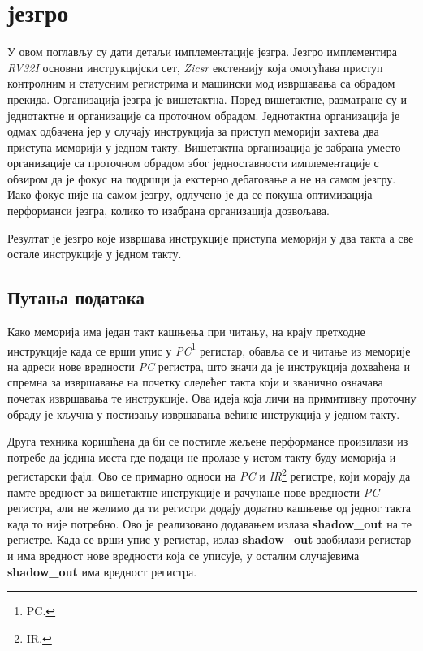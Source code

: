 \chapter{ језгро}

У овом поглављу су дати детаљи имплементације  језгра. Језгро имплементира \textit{RV32I} основни инструкцијски сет, \textit{Zicsr} екстензију која омогућава приступ контролним и статусним регистрима и машински мод извршавања са обрадом прекида.
Организација језгра је вишетактна. Поред вишетактне, разматране су и једнотактне и организације са проточном обрадом. Једнотактна организација је одмах одбачена јер у случају инструкција за приступ меморији захтева два приступа меморији у једном такту. Вишетактна организација је забрана уместо организације са проточном обрадом због једноставности имплементације с обзиром да је фокус на подршци ја екстерно дебаговање а не на самом језгру.
Иако фокус није на самом језгру, одлучено је да се покуша оптимизација перформанси језгра, колико то изабрана организација дозвољава.

Резултат је језгро које извршава инструкције приступа меморији у два такта а све остале инструкције у једном такту.

\section{Путања података}

Како меморија има један такт кашњења при читању, на крају претходне инструкције када се врши упис у \textit{\acrshort{PC}}\footnote{\acrfull{PC}.} регистар, обавља се и читање из меморије на адреси нове вредности \textit{\acrshort{PC}} регистра, што значи да је инструкција дохваћена и спремна за извршавање на почетку следећег такта који и званично означава почетак извршавања те инструкције. Ова идеја која личи на примитивну проточну обраду је кључна у постизању извршавања већине инструкција у једном такту.

Друга техника коришћена да би се постигле жељене перформансе произилази из потребе да једина места где подаци не пролазе у истом такту буду меморија и регистарски фајл. Ово се примарно односи на \textit{\acrshort{PC}} и \textit{\acrshort{IR}}\footnote{\acrfull{IR}.} регистре, који морају да памте вредност за вишетактне инструкције и рачунање нове вредности \textit{\acrshort{PC}} регистра, али не желимо да ти регистри додају додатно кашњење од једног такта када то није потребно. Ово је реализовано додавањем излаза \textbf{shadow\_out} на те регистре. Када се врши упис у регистар, излаз \textbf{shadow\_out} заобилази регистар и има вредност нове вредности која се уписује, у осталим случајевима \textbf{shadow\_out} има вредност регистра.

